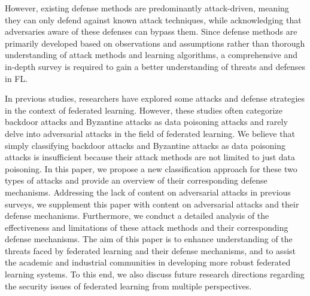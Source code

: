 \documentclass[conference]{IEEEtran}
\begin{document}
However, existing defense methods are predominantly attack-driven, 
meaning they can only defend against known attack techniques, 
while acknowledging that adversaries aware of these defenses can bypass them. 
Since defense methods are primarily developed based on observations 
and assumptions rather than thorough understanding of attack methods 
and learning algorithms, 
a comprehensive and in-depth survey is required to gain a better understanding of 
threats and defenses in FL.

In previous studies\cite{b11,b12,b13,b14,b15}, 
researchers have explored some attacks and defense strategies in the context 
of federated learning. 
However, these studies often categorize backdoor attacks 
and Byzantine attacks as data poisoning attacks and 
rarely delve into adversarial attacks in the field of federated learning. 
We believe that simply classifying backdoor attacks and Byzantine attacks 
as data poisoning attacks is insufficient 
because their attack methods are not limited to just data poisoning.
In this paper, we propose a new classification approach for these two 
types of attacks and provide an overview of their corresponding defense mechanisms. 
Addressing the lack of content on adversarial attacks in previous surveys, 
we supplement this paper with content on adversarial attacks and their defense 
mechanisms. 
Furthermore, we conduct a detailed analysis of the effectiveness and limitations 
of these attack methods and their corresponding defense mechanisms. 
The aim of this paper is to enhance understanding of the threats faced 
by federated learning and their defense mechanisms, 
and to assist the academic and industrial communities in 
developing more robust federated learning systems. 
To this end, we also discuss future research directions 
regarding the security issues of federated learning from multiple perspectives.
\end{document}
